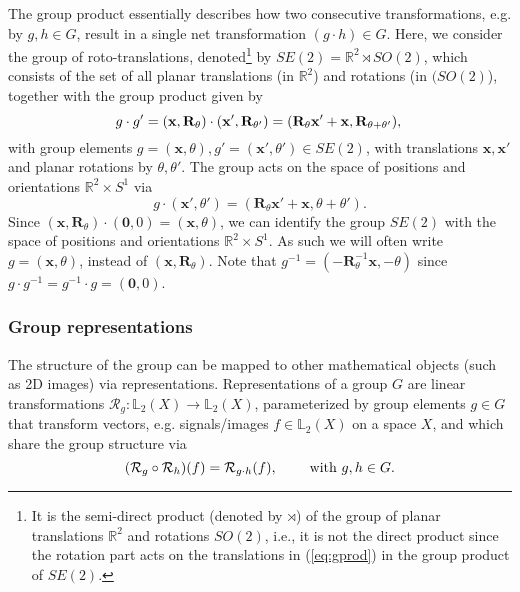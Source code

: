 \documentclass[twocolumn,final]{article}
\begin{document}
The group product essentially describes how two consecutive transformations, e.g. by $g,h \in G$, result in a single net transformation $(g \cdot h) \in G$. Here, we consider the group of roto-translations, denoted\footnote{It is the semi-direct product (denoted by $\rtimes$) of the group of planar translations $\mathbb{R}^2$ and rotations $SO(2)$, i.e., it is not the direct product since the rotation part acts on the translations in (\ref{eq:gprod}) in the group product of $SE(2)$.} by $SE(2) = \mathbb{R}^2 \rtimes SO(2)$, which consists of the set of all planar translations (in $\mathbb{R}^2$) and rotations (in $(SO(2)$), together with the group product given by
\begin{equation}
\label{eq:gprod}
g \cdot g' = ( \mathbf{x},\mathbf{R}_\theta ) \cdot ( \mathbf{x}', \mathbf{R}_{\theta'} )
= ( \mathbf{R}_\theta \mathbf{x}' + \mathbf{x}, \mathbf{R}_{\theta + \theta'}),\\
\end{equation}
with group elements $g = (\mathbf{x},\theta), g' = (\mathbf{x}',\theta') \in SE(2)$, with translations $\mathbf{x},\mathbf{x}'$ and planar rotations by $\theta,\theta'$. 
The group acts on the space of positions and orientations $\mathbb{R}^2 \times S^1$ via
$$
g \cdot (\mathbf{x}',\theta') = ( \mathbf{R}_\theta \mathbf{x}' + \mathbf{x}, \theta +\theta').
$$
Since $( \mathbf{x} , \mathbf{R}_\theta ) \cdot ( \mathbf{0}, 0 ) = ( \mathbf{x} , \theta )$, we can identify the group $SE(2)$ with the space of positions and orientations $\mathbb{R}^2 \times S^1$. As such we will often write $g=(\mathbf{x},\theta)$, instead of $(\mathbf{x},\mathbf{R}_\theta)$. Note that $g^{-1} = ( -\mathbf{R}_{\theta}^{-1} \mathbf{x},-\theta)$ since $g \cdot g^{-1} = g^{-1} \cdot g = (\mathbf{0},0)$.

\subsubsection{Group representations}
The structure of the group can be mapped to other mathematical objects (such as 2D images) via representations. Representations of a group $G$ are linear transformations $\mathcal{R}_g: \mathbb{L}_2(X) \rightarrow \mathbb{L}_2(X)$, parameterized by group elements $g \in G$ that transform vectors, e.g. signals/images $f \in \mathbb{L}_2(X)$ on a space $X$, and which share the group structure via
$$
(\mathcal{R}_g \circ \mathcal{R}_h)(f) = \mathcal{R}_{g \cdot h} (f), \hspace{8mm} \text{with $g,h\in G$}.
$$
\end{document}
